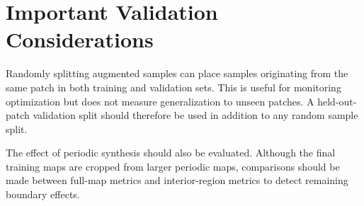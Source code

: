\documentclass[11pt]{article}
\begin{document}
\section{Important Validation Considerations}

Randomly splitting augmented samples can place samples originating from the
same patch in both training and validation sets.  This is useful for monitoring
optimization but does not measure generalization to unseen patches.  A
held-out-patch validation split should therefore be used in addition to any
random sample split.

The effect of periodic synthesis should also be evaluated.  Although the final
training maps are cropped from larger periodic maps, comparisons should be made
between full-map metrics and interior-region metrics to detect remaining
boundary effects.
\end{document}
